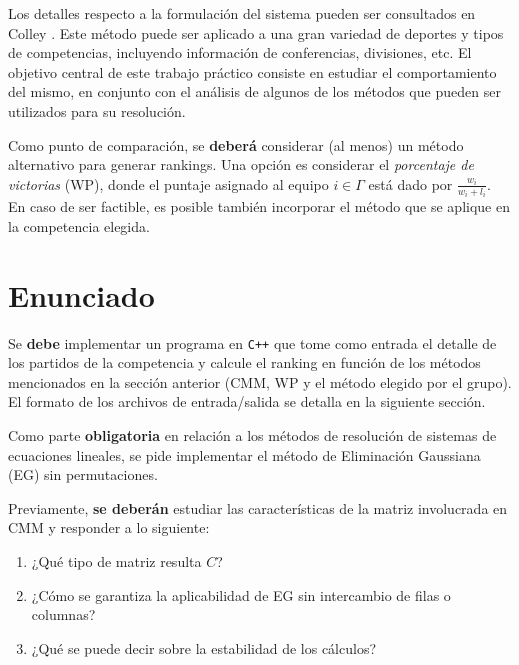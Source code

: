 \documentclass[11pt,a4paper]{article}
\begin{document}
Los detalles respecto a la formulación del sistema pueden ser consultados en Colley \cite{Colley}. Este método puede ser aplicado a una gran variedad de 
deportes y tipos de competencias, incluyendo información de conferencias, divisiones, etc. El objetivo central de este trabajo práctico consiste en
estudiar el comportamiento del mismo, en conjunto con el análisis de algunos de los métodos que pueden ser utilizados para su resolución.

Como punto de comparación, se \textbf{deberá} considerar (al menos) un método alternativo para generar rankings. Una opción es considerar el \emph{porcentaje 
de victorias} (WP), donde el puntaje asignado al equipo $i \in \Gamma$ está dado por $\frac{w_i}{w_i + l_i}$. 
%
En caso de ser factible, es posible también incorporar el método que se aplique en la competencia elegida.


\section*{Enunciado}

Se \textbf{debe} implementar un programa en \verb-C++- que tome como entrada el detalle de los partidos de la competencia y calcule el ranking
en función de los métodos mencionados en la sección anterior (CMM, WP y el método elegido por el grupo). El formato de los archivos de entrada/salida se detalla en la siguiente sección.

Como parte \textbf{obligatoria} en relación a los métodos de resolución de sistemas
de ecuaciones lineales, se pide implementar el método de Eliminación Gaussiana (EG) sin permutaciones.

Previamente, \textbf{se deberán} estudiar las características de la matriz involucrada en CMM y responder a lo siguiente:
\begin{enumerate}
	\item ¿Qué tipo de matriz resulta $C$? 
	\item ¿Cómo se garantiza la aplicabilidad de EG sin intercambio de filas o columnas? 
	\item ¿Qué se puede decir sobre la estabilidad de los cálculos?
\end{enumerate}
\end{document}
